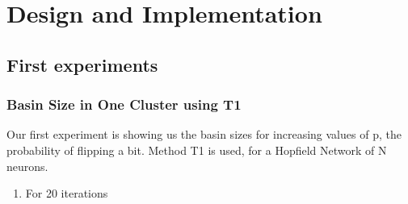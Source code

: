 \chapter{Design and Implementation}

\section{First experiments}

\subsection{Basin Size in One Cluster using T1}

Our first experiment is showing us the basin sizes for increasing values of p, the probability of flipping a bit. Method T1 is used, for a Hopfield Network of N neurons.

\begin{enumerate}
 \item For 20 iterations
\end{enumerate}

